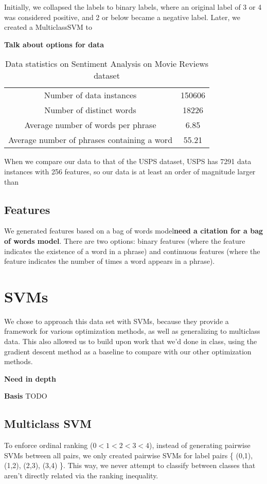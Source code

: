 \documentclass[letterpaper, 11pt]{article}
\begin{document}
Initially, we collapsed the labels to binary labels, where an original label of 3 or 4 was considered positive, and 2 or below became a negative label.  Later, we created a MulticlassSVM to 

\textbf{Talk about options for data}

\begin{table}
\centering
\caption{Data statistics on Sentiment Analysis on Movie Reviews dataset}
\label{stats}
\begin{tabular}{cc}
\hline
Number of data instances & 150606\\
Number of distinct words & 18226\\
Average number of words per phrase & 6.85\\
Average number of phrases containing a word & 55.21

\end{tabular}
\end{table}

When we compare our data to that of the USPS dataset, USPS has 7291 data instances with 256 features, so our data is at least an order of magnitude larger than 

\subsection{Features}
We generated features based on a bag of words model\textbf{need a citation for a bag of words model}.  There are two options: binary features (where the feature indicates the existence of a word in a phrase) and continuous features (where the feature indicates the number of times a word appears in a phrase).

\section{SVMs}

We chose to approach this data set with SVMs, because they provide a framework for various optimization methods, as well as generalizing to multiclass data.  This also allowed us to build upon work that we'd done in class, using the gradient descent method as a baseline to compare with our other optimization methods.

\textbf{Need in depth }

\textbf{Basis} TODO

\subsection{Multiclass SVM}
To enforce ordinal ranking ($0 < 1 < 2 < 3 < 4$), instead of generating pairwise SVMs between all pairs, we only created pairwise SVMs for label pairs \{ (0,1), (1,2), (2,3), (3,4) \}.  This way, we never attempt to classify between classes that aren't directly related via the ranking inequality.
\end{document}
